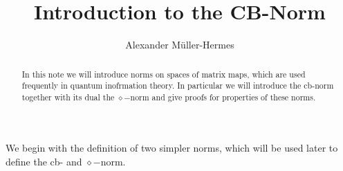 \documentclass[a4paper
               ,12pt
               ,DIV=12
               ,oneside
               ]
               {amsart}
\theoremstyle{plain}
\theoremstyle{remark}
\begin{document}
   

\author{Alexander M\"uller-Hermes}
\address{TU Munich, Munich, Germany}

\title[Norms of Matrix Maps]{Introduction to the CB-Norm}

\begin{abstract}
In this note we will introduce norms on spaces of matrix maps, which are used frequently in quantum inofrmation theory. In particular we will introduce the cb-norm together with its dual the $\diamond-$norm and give proofs for properties of these norms. 
\end{abstract}

\maketitle
 

We begin with the definition of two simpler norms, which will be used later to define the cb- and $\diamond-$norm.
\end{document}
